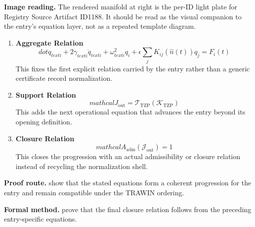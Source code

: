 \begin{samepage}
\noindent\begin{minipage}[t]{0.45\linewidth}
\vspace{0pt}
\raggedright
\scriptsize\textbf{Image reading.} The rendered manifold at right is the per-ID light plate for Registry Source Artifact ID1188. It should be read as the visual companion to the entry's equation layer, not as a repeated template diagram.\par
\end{minipage}\hfill
\begin{minipage}[t]{0.53\linewidth}
\vspace*{-0.10in}
\raggedright
{}
\end{minipage}
\end{samepage}

\clearpage


\begin{enumerate}[leftmargin=1.6em,itemsep=9pt,topsep=6pt]
\item \textbf{Aggregate Relation}
\[
dot{q}_{ text{i}}+2\gamma_{ text{i}}\dot{q}_{ text{i}}+\omega_{ text{i}}^{2}q_{i}+\epsilon\sum_{j}K_{ij}(\hat{n}(t))q_{j}=F_{i}(t)
\]
This fixes the first explicit relation carried by the entry rather than a generic certificate record normalization.

\item \textbf{Support Relation}
\[
mathcal{J}_{\mathrm{out}} = \mathcal{T}_{\mathrm{TZP}}\!\left(\mathcal{K}_{\mathrm{TZP}}\right)
\]
This adds the next operational equation that advances the entry beyond its opening definition.

\item \textbf{Closure Relation}
\[
mathcal{A}_{\mathrm{adm}}\!\left(\mathcal{J}_{\mathrm{out}}\right)=1
\]
This closes the progression with an actual admissibility or closure relation instead of recycling the normalization shell.
\end{enumerate}

\textbf{Proof route.} show that the stated equations form a coherent progression for the entry and remain compatible under the TRAWIN ordering.

\textbf{Formal method.} prove that the final closure relation follows from the preceding entry-specific equations.

